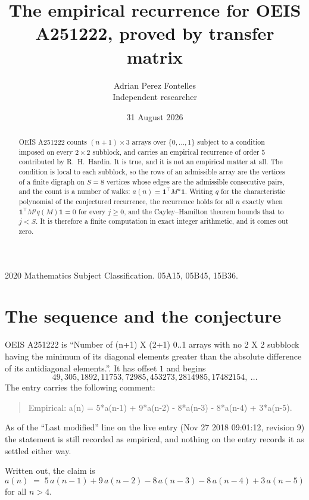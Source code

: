 \documentclass[11pt,a4paper]{article}
\title{The empirical recurrence for OEIS A251222, proved by transfer matrix}
\author{Adrian Perez Fontelles\\ \small Independent researcher}
\date{31 August 2026}
\theoremstyle{plain}
\theoremstyle{definition}
\begin{document}
\maketitle

\begin{abstract}
OEIS A251222 counts $(n+1)\times3$ arrays over $\{0,\dots,1\}$ subject to a condition imposed on
every $2\times2$ subblock, and carries an empirical recurrence of order $5$ contributed
by R.~H.~Hardin. It is true, and it is not an empirical matter at all. The condition is local
to each subblock, so the rows of an admissible array are the vertices of a finite digraph
on $S=8$ vertices whose edges are the admissible consecutive pairs, and the count is a
number of walks: $a(n)=\mathbf{1}^{\!\top}M^{n}\mathbf{1}$. Writing $q$
for the characteristic polynomial of the conjectured recurrence, the recurrence holds for all
$n$ exactly when $\mathbf{1}^{\!\top}M^{j}q(M)\mathbf{1}=0$ for every $j\ge0$, and the
Cayley--Hamilton theorem bounds that to $j<S$. It is therefore a finite computation in exact
integer arithmetic, and it comes out zero.
\end{abstract}

\noindent\small 2020 Mathematics Subject Classification. 05A15, 05B45, 15B36.\normalsize

\section{The sequence and the conjecture}

OEIS A251222 is ``Number of (n+1) X (2+1) 0..1 arrays with no 2 X 2 subblock having the minimum of its diagonal elements greater than the absolute difference of its antidiagonal elements.''. It has offset $1$ and begins
\[
49, 305, 1892, 11753, 72985, 453273, 2814985, 17482154,\ \dots
\]
The entry carries the following comment:
\begin{quote}\small
Empirical: a(n) = 5*a(n-1) + 9*a(n-2) - 8*a(n-3) - 8*a(n-4) + 3*a(n-5).
\end{quote}
As of the ``Last modified'' line on the live entry (Nov 27 2018 09:01:12, revision 9) the statement is
still recorded as empirical, and nothing on the entry records it as settled either way.

Written out, the claim is
\begin{equation}\label{eq:conj}
a(n)\;=\;5\,a(n-1) + 9\,a(n-2) - 8\,a(n-3) - 8\,a(n-4) + 3\,a(n-5)
\end{equation}
for all $n>4$.
\end{document}

